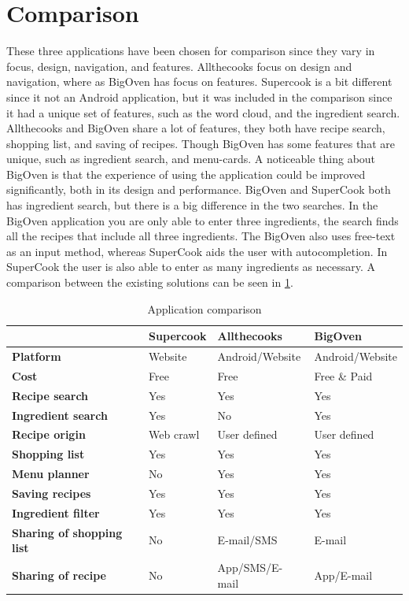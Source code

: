 \section{Comparison}
These three applications have been chosen for comparison since they vary in focus, design, navigation, and features. Allthecooks focus on design and navigation, where as BigOven has focus on features. Supercook is a bit different since it not an Android application, but it was included in the comparison since it had a unique set of features, such as the word cloud, and the ingredient search.
Allthecooks and BigOven share a lot of features, they both have recipe search, shopping list, and saving of recipes. Though BigOven has some features that are unique, such as ingredient search, and menu-cards. A noticeable thing about BigOven is that the experience of using the application could be improved significantly, both in its design and performance.
BigOven and SuperCook both has ingredient search, but there is a big difference in the two searches. In the BigOven application you are only able to enter three ingredients, the search finds all the recipes that include all three ingredients. The BigOven also uses free-text as an input method, whereas SuperCook aids the user with autocompletion. In SuperCook the user is also able to enter as many ingredients as necessary.
A comparison between the existing solutions can be seen in \ref{tab:appcomparison}.
\begin{table}[H]
\centering
\begin{tabular}{|>{\bfseries}l|l|l|l|}
\hline
 & \textbf{Supercook} & \textbf{Allthecooks} & \textbf{BigOven} \\
\hline
Platform & Website & Android/Website & Android/Website \\
\hline
Cost & Free & Free & Free \& Paid \\
\hline
Recipe search & Yes & Yes & Yes  \\
\hline
Ingredient search & Yes & No & Yes \\
\hline
Recipe origin & Web crawl & User defined & User defined \\
\hline
Shopping list & Yes & Yes & Yes \\
\hline
Menu planner & No & Yes & Yes \\
\hline
Saving recipes & Yes & Yes & Yes \\
\hline
Ingredient filter & Yes & Yes & Yes \\
\hline
Sharing of shopping list & No & E-mail/SMS & E-mail \\
\hline
Sharing of recipe & No & App/SMS/E-mail & App/E-mail \\
\hline
\end{tabular}
\caption{Application comparison}
\label{tab:appcomparison}
\end{table}

